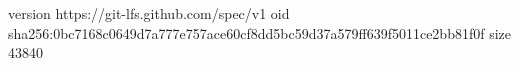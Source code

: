 version https://git-lfs.github.com/spec/v1
oid sha256:0bc7168c0649d7a777e757ace60cf8dd5bc59d37a579ff639f5011ce2bb81f0f
size 43840

